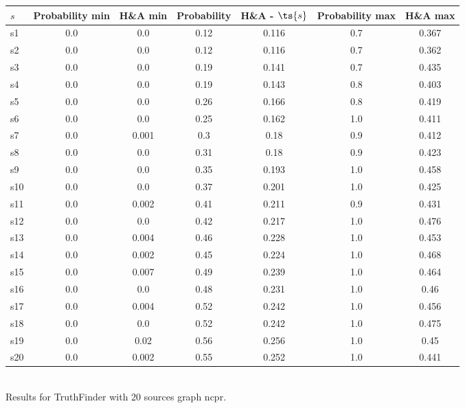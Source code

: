 \documentclass{article}
\begin{document}
\noindent\begin{tabular}{|l|c|c|c|c|c|c|}
\hline
$s$& Probability min & H\&A min & Probability & H\&A - $\ts{s}$ & Probability max & H\&A max\\
\hline
s1 &0.0 & 0.0 & 0.12 & 0.116 & 0.7 & 0.367\\
\hline
s2 &0.0 & 0.0 & 0.12 & 0.116 & 0.7 & 0.362\\
\hline
s3 &0.0 & 0.0 & 0.19 & 0.141 & 0.7 & 0.435\\
\hline
s4 &0.0 & 0.0 & 0.19 & 0.143 & 0.8 & 0.403\\
\hline
s5 &0.0 & 0.0 & 0.26 & 0.166 & 0.8 & 0.419\\
\hline
s6 &0.0 & 0.0 & 0.25 & 0.162 & 1.0 & 0.411\\
\hline
s7 &0.0 & 0.001 & 0.3 & 0.18 & 0.9 & 0.412\\
\hline
s8 &0.0 & 0.0 & 0.31 & 0.18 & 0.9 & 0.423\\
\hline
s9 &0.0 & 0.0 & 0.35 & 0.193 & 1.0 & 0.458\\
\hline
s10 &0.0 & 0.0 & 0.37 & 0.201 & 1.0 & 0.425\\
\hline
s11 &0.0 & 0.002 & 0.41 & 0.211 & 0.9 & 0.431\\
\hline
s12 &0.0 & 0.0 & 0.42 & 0.217 & 1.0 & 0.476\\
\hline
s13 &0.0 & 0.004 & 0.46 & 0.228 & 1.0 & 0.453\\
\hline
s14 &0.0 & 0.002 & 0.45 & 0.224 & 1.0 & 0.468\\
\hline
s15 &0.0 & 0.007 & 0.49 & 0.239 & 1.0 & 0.464\\
\hline
s16 &0.0 & 0.0 & 0.48 & 0.231 & 1.0 & 0.46\\
\hline
s17 &0.0 & 0.004 & 0.52 & 0.242 & 1.0 & 0.456\\
\hline
s18 &0.0 & 0.0 & 0.52 & 0.242 & 1.0 & 0.475\\
\hline
s19 &0.0 & 0.02 & 0.56 & 0.256 & 1.0 & 0.45\\
\hline
s20 &0.0 & 0.002 & 0.55 & 0.252 & 1.0 & 0.441\\
\hline
\end{tabular}\\

\noindent Results for TruthFinder with 20 sources graph ncpr.
\end{document}
